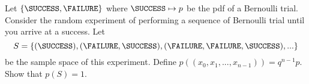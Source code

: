   Let $\{\SUCCESS, \FAILURE\}$ where $\SUCCESS \mapsto p$ be the pdf of a Bernoulli trial.
  Consider the random experiment of performing a sequence of Bernoulli trial
  until you arrive at a success.
  Let
  \[
  S = \{(\SUCCESS), (\FAILURE, \SUCCESS), (\FAILURE, \FAILURE, \SUCCESS), ...\}
  \]
  be the sample space of this experiment.
  Define $p((x_0, x_1, ..., x_{n-1})) = q^{n-1}p$.
  Show that $p(S) = 1$.
